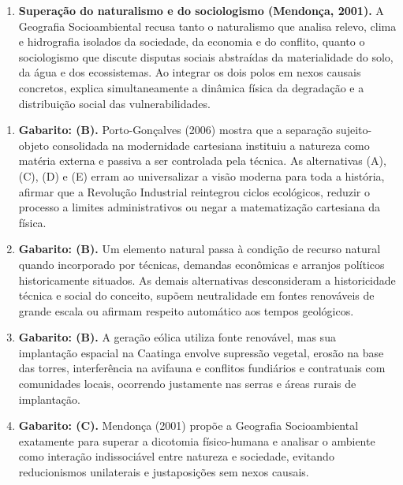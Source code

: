 \begin{boxGabarito}
\begin{enumerate}[leftmargin=1.8em, itemsep=4pt, start=6]
  \item \textbf{Superação do naturalismo e do sociologismo (Mendonça, 2001).} A Geografia Socioambiental recusa tanto o naturalismo que analisa relevo, clima e hidrografia isolados da sociedade, da economia e do conflito, quanto o sociologismo que discute disputas sociais abstraídas da materialidade do solo, da água e dos ecossistemas. Ao integrar os dois polos em nexos causais concretos, explica simultaneamente a dinâmica física da degradação e a distribuição social das vulnerabilidades.
\end{enumerate}
\end{boxGabarito}

\begin{boxGabarito}
\begin{enumerate}[leftmargin=1.8em, itemsep=4pt, start=11]
  \item \textbf{Gabarito: (B).} Porto-Gonçalves (2006) mostra que a separação sujeito-objeto consolidada na modernidade cartesiana instituiu a natureza como matéria externa e passiva a ser controlada pela técnica. As alternativas (A), (C), (D) e (E) erram ao universalizar a visão moderna para toda a história, afirmar que a Revolução Industrial reintegrou ciclos ecológicos, reduzir o processo a limites administrativos ou negar a matematização cartesiana da física.

  \item \textbf{Gabarito: (B).} Um elemento natural passa à condição de recurso natural quando incorporado por técnicas, demandas econômicas e arranjos políticos historicamente situados. As demais alternativas desconsideram a historicidade técnica e social do conceito, supõem neutralidade em fontes renováveis de grande escala ou afirmam respeito automático aos tempos geológicos.

  \item \textbf{Gabarito: (B).} A geração eólica utiliza fonte renovável, mas sua implantação espacial na Caatinga envolve supressão vegetal, erosão na base das torres, interferência na avifauna e conflitos fundiários e contratuais com comunidades locais, ocorrendo justamente nas serras e áreas rurais de implantação.

  \item \textbf{Gabarito: (C).} Mendonça (2001) propõe a Geografia Socioambiental exatamente para superar a dicotomia físico-humana e analisar o ambiente como interação indissociável entre natureza e sociedade, evitando reducionismos unilaterais e justaposições sem nexos causais.


\end{enumerate}
\end{boxGabarito}
